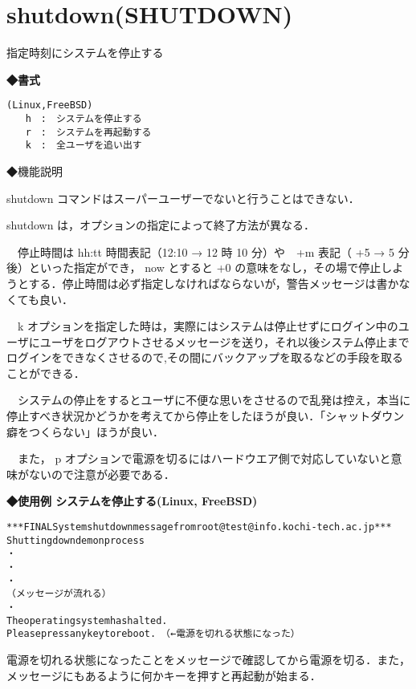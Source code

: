 \label{cmd:shutdown}
\section{shutdown(SHUTDOWN)}

指定時刻にシステムを停止する\par

{\bf ◆書式}
\begin{center}
\begin{screen}
\begin{alltt}
(Linux, FreeBSD)
 % shutdown [-h | -r | -k] 停止時間 警告メッセージ
 　　h　:　システムを停止する
 　　r　:　システムを再起動する
 　　k　:　全ユーザを追い出す
\end{alltt}
\end{screen}
\end{center}

◆機能説明\par
 shutdown コマンドはスーパーユーザーでないと行うことはできない．

 shutdown は，オプションの指定によって終了方法が異なる．\par
　停止時間は hh:tt 時間表記（12:10 → 12 時 10 分）や　+m 表記（ +5 → 5 分後）といった指定ができ， now とすると +0 の意味をなし，その場で停止しようとする．停止時間は必ず指定しなければならないが，警告メッセージは書かなくても良い．\par
　k オプションを指定した時は，実際にはシステムは停止せずにログイン中のユーザにユーザをログアウトさせるメッセージを送り，それ以後システム停止までログインをできなくさせるので,その間にバックアップを取るなどの手段を取ることができる．\par
　システムの停止をするとユーザに不便な思いをさせるので乱発は控え，本当に停止すべき状況かどうかを考えてから停止をしたほうが良い．「シャットダウン癖をつくらない」ほうが良い．\par
　また， p オプションで電源を切るにはハードウエア側で対応していないと意味がないので注意が必要である．\par

{\bf ◆使用例   システムを停止する(Linux, FreeBSD)}
\begin{center}
\begin{breakbox}
\begin{alltt}
 % \underline{shutdown -h now}  \keybox{Enter}
 *** FINAL System shutdown message from root@test@info.kochi-tech.ac.jp ***
 Shutting down demon process
 ・
 ・
 ・
 （メッセージが流れる）
 ・
 The operating system has halted.
 Please press any key to reboot.　（←電源を切れる状態になった）
\end{alltt}
\end{breakbox}
\end{center}
電源を切れる状態になったことをメッセージで確認してから電源を切る．また，メッセージにもあるように何かキーを押すと再起動が始まる．\\

